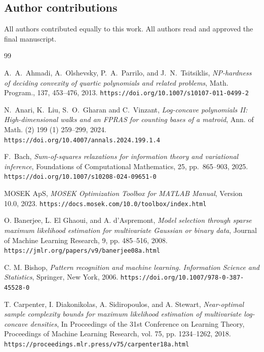 \documentclass[pdflatex,sn-mathphys-num]{sn-jnl}%
\newcommand{\rd}[1]{{\color{red}#1}}
\theoremstyle{thmstyleone}%
\theoremstyle{thmstyletwo}%
\theoremstyle{thmstylethree}%
\begin{document}
\subsection*{Author contributions}
\rd{All authors contributed equally to this work. All authors read and
approved the final manuscript.}


\begin{thebibliography}{99}
\providecommand{\natexlab}[1]{#1}
\providecommand{\url}[1]{\texttt{#1}}
\providecommand{\urlprefix}{URL }

{\sc A.~A.~Ahmadi, A.~Olshevsky, P.~A.~Parrilo, and J.~N.~Tsitsiklis},
{\em NP-hardness of deciding convexity of quartic polynomials and related problems},
Math. Program., 137, 453--476, 2013.
\url{https://doi.org/10.1007/s10107-011-0499-2}

{\sc N.~Anari, K.~Liu, S.~O.~Gharan and C.~Vinzant},
{\em Log-concave polynomials II: High-dimensional walks and an FPRAS for counting bases of a matroid},
Ann. of Math. (2) 199 (1) 259--299, 2024.
\url{https://doi.org/10.4007/annals.2024.199.1.4}


{\sc F.~Bach},
{\em Sum-of-squares relaxations for information theory and
variational inference},
Foundations of Computational Mathematics, 25,
pp.~865--903, 2025.
\url{https://doi.org/10.1007/s10208-024-09651-0}



{\sc MOSEK ApS}, {\em MOSEK Optimization Toolbox for MATLAB Manual},
Version 10.0, 2023.
\url{https://docs.mosek.com/10.0/toolbox/index.html}


{\sc O. Banerjee, L. El Ghaoui, and A. d'Aspremont},
{\em Model selection through sparse maximum likelihood estimation for multivariate Gaussian or binary data},
Journal of Machine Learning Research, 9,
pp. 485--516, 2008.
\url{https://jmlr.org/papers/v9/banerjee08a.html}


{\sc C. M. Bishop},
{\em Pattern recognition and machine learning. Information Science and Statistics}, Springer, New York, 2006.
\url{https://doi.org/10.1007/978-0-387-45528-0}

{\sc T. Carpenter, I. Diakonikolas, A. Sidiropoulos, and A. Stewart},
{\em Near-optimal sample complexity bounds for maximum likelihood estimation of multivariate log-concave densities},
In Proceedings of the 31st Conference on Learning Theory,
Proceedings of Machine Learning Research, vol. 75,
pp. 1234--1262, 2018.
\url{https://proceedings.mlr.press/v75/carpenter18a.html}


\end{thebibliography}
\end{document}
